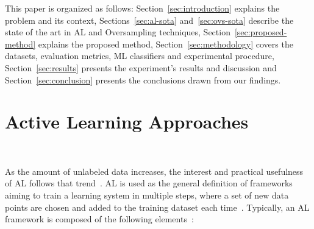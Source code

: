 \documentclass[remotesensing,article,submit,moreauthors,pdftex]{Definitions/mdpi}
\begin{document}
This paper is organized as follows: Section~\ref{sec:introduction} explains
the problem and its context, Sections~\ref{sec:al-sota} and~\ref{sec:ovs-sota}
describe the state of the art in AL and Oversampling techniques,
Section~\ref{sec:proposed-method} explains the proposed method,
Section~\ref{sec:methodology} covers the datasets, evaluation metrics, ML
classifiers and experimental procedure, Section~\ref{sec:results} presents the
experiment's results and discussion and Section~\ref{sec:conclusion} presents
the conclusions drawn from our findings.

\section{Active Learning Approaches}~\label{sec:al-sota}

As the amount of unlabeled data increases, the interest and practical
usefulness of AL follows that trend~\cite{Kottke2017}. AL is used as the
general definition of frameworks aiming to train a learning system in multiple
steps, where a set of new data points are chosen and added to the training
dataset each time~\cite{Ruzicka2020}. Typically, an AL framework is composed
of the following elements~\cite{Sverchkov2017,Su2020,Ruzicka2020}:
\end{document}
